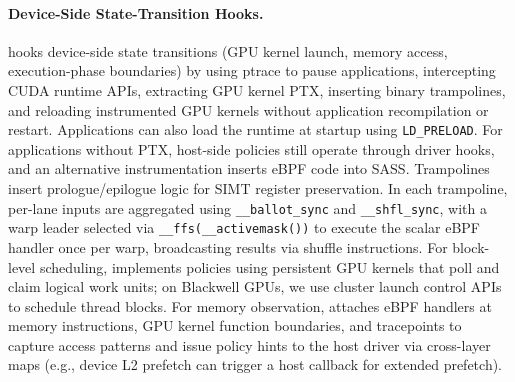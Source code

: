 \paragraph{Device-Side State-Transition Hooks.}
\sys hooks device-side state transitions (GPU kernel launch, memory access, execution-phase boundaries) by using ptrace to pause applications, intercepting CUDA runtime APIs, extracting GPU kernel PTX, inserting binary trampolines, and reloading instrumented GPU kernels without application recompilation or restart.
Applications can also load the runtime at startup using \texttt{LD\_PRELOAD}.
For applications without PTX, host-side policies still operate through driver hooks, and an alternative instrumentation inserts eBPF code into SASS.
Trampolines insert prologue/epilogue logic for SIMT register preservation.
In each trampoline, per-lane inputs are aggregated using \texttt{\_\_ballot\_\allowbreak{}sync} and \texttt{\_\_shfl\_\allowbreak{}sync}, with a warp leader selected via \texttt{\_\_ffs\allowbreak{}(\_\_active\-mask())} to execute the scalar eBPF handler once per warp, broadcasting results via shuffle instructions.
For block-level scheduling, \sys implements policies using persistent GPU kernels that poll and claim logical work units; on Blackwell GPUs, we use cluster launch control APIs~\cite{cuda-clc} to schedule thread blocks.
For memory observation, \sys attaches eBPF handlers at memory instructions, GPU kernel function boundaries, and tracepoints to capture access patterns and issue policy hints to the host driver via cross-layer maps (e.g., device L2 prefetch can trigger a host callback for extended prefetch).

